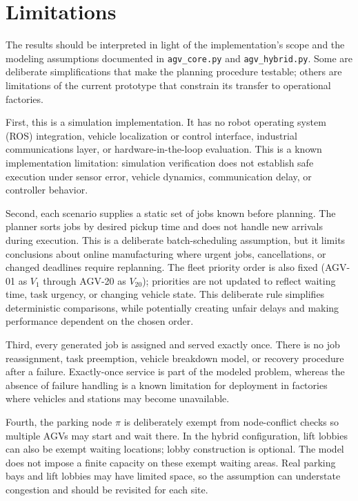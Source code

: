 \documentclass[11pt]{article}
\begin{document}
\section{Limitations}
\label{sec:limitations}

The results should be interpreted in light of the implementation's scope and
the modeling assumptions documented in \texttt{agv\_core.py} and
\texttt{agv\_hybrid.py}. Some are deliberate simplifications that make the
planning procedure testable; others are limitations of the current prototype
that constrain its transfer to operational factories.

First, this is a simulation implementation. It has no robot operating system
(ROS) integration, vehicle localization or control interface, industrial
communications layer, or hardware-in-the-loop evaluation. This is a known
implementation limitation: simulation verification does not establish safe
execution under sensor error, vehicle dynamics, communication delay, or
controller behavior.

Second, each scenario supplies a static set of jobs known before planning.
The planner sorts jobs by desired pickup time and does not handle new arrivals
during execution. This is a deliberate batch-scheduling assumption, but it
limits conclusions about online manufacturing where urgent jobs, cancellations,
or changed deadlines require replanning. The fleet priority order is also
fixed (AGV-01 as $V_1$ through AGV-20 as $V_{20}$); priorities are not updated
to reflect waiting time, task urgency, or changing vehicle state. This
deliberate rule simplifies deterministic comparisons, while potentially
creating unfair delays and making performance dependent on the chosen order.

Third, every generated job is assigned and served exactly once. There is no
job reassignment, task preemption, vehicle breakdown model, or recovery
procedure after a failure. Exactly-once service is part of the modeled
problem, whereas the absence of failure handling is a known limitation for
deployment in factories where vehicles and stations may become unavailable.

Fourth, the parking node $\pi$ is deliberately exempt from node-conflict
checks so multiple AGVs may start and wait there. In the hybrid configuration,
lift lobbies can also be exempt waiting locations; lobby construction is
optional. The model does not impose a finite capacity on these exempt waiting
areas. Real parking bays and lift lobbies may have limited space, so the
assumption can understate congestion and should be revisited for each site.
\end{document}

